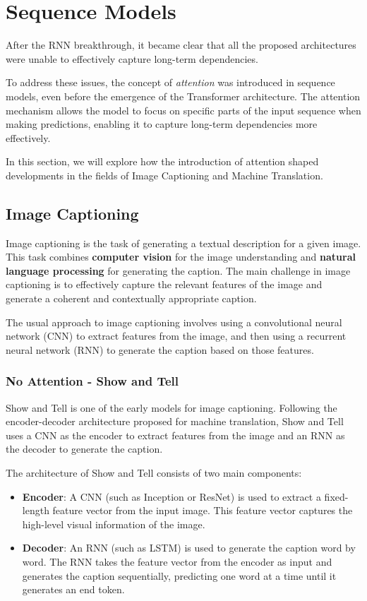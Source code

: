 \section{Sequence Models}
After the RNN breakthrough, it became clear that all the proposed architectures were 
unable to effectively capture long-term dependencies.

To address these issues, the concept of \textit{attention} was introduced in sequence models, 
even before the emergence of the Transformer architecture. 
The attention mechanism allows the model to focus on specific parts of the input sequence when making predictions, 
enabling it to capture long-term dependencies more effectively.

In this section, we will explore how the introduction of attention shaped developments 
in the fields of Image Captioning and Machine Translation.

\subsection{Image Captioning}
Image captioning is the task of generating a textual description for a given image.
This task combines \textbf{computer vision} for the image understanding and \textbf{natural language processing} for generating the caption.
The main challenge in image captioning is to effectively capture the relevant features of the image and generate a coherent and contextually appropriate caption.


The usual approach to image captioning involves using a convolutional neural network (CNN) to extract features from the image,
and then using a recurrent neural network (RNN) to generate the caption based on those features.

\subsubsection{No Attention - Show and Tell}
Show and Tell is one of the early models for image captioning. Following the encoder-decoder architecture proposed
for machine translation, Show and Tell uses a CNN as the encoder to extract features from the image and an RNN as the decoder to generate the caption.

The architecture of Show and Tell consists of two main components:
\begin{itemize}
    \item \textbf{Encoder}: A CNN (such as Inception or ResNet) is used to extract a fixed-length feature vector from the input image. 
    This feature vector captures the high-level visual information of the image.
    \item \textbf{Decoder}: An RNN (such as LSTM) is used to generate the caption word by word. 
    The RNN takes the feature vector from the encoder as input and generates the caption sequentially, predicting one word at a time until it generates an end token.
\end{itemize}

